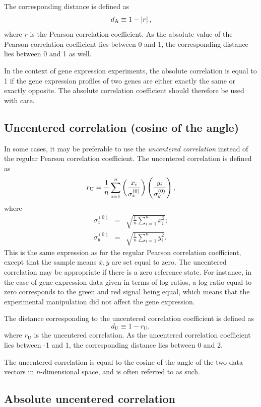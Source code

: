 \documentclass{report}
\begin{document}
The corresponding distance is defined as
$$d_{\textrm A} \equiv 1 - \left|r\right|,$$
where $r$ is the Pearson correlation coefficient. As the absolute value of the Pearson correlation coefficient lies between 0 and 1, the corresponding distance lies between 0 and 1 as well.

In the context of gene expression experiments, the absolute correlation is equal to 1 if the gene expression profiles of two genes are either exactly the same or exactly opposite. The absolute correlation coefficient should therefore be used with care.

\subsection*{Uncentered correlation (cosine of the angle)}

In some cases, it may be preferable to use the \emph{uncentered correlation} instead of the regular Pearson correlation coefficient. The uncentered correlation is defined as
$$r_{\textrm U} = \frac{1}{n} \sum_{i=1}^{n} \left(\frac{x_i}{\sigma_x^{(0)}} \right) \left(\frac{y_i}{\sigma_y^{(0)}} \right),$$
where
\begin{eqnarray}
\sigma_x^{(0)} & = & \sqrt{{\frac{1}{n}} \sum_{i=1}^{n}x_i^2}; \nonumber \\
\sigma_y^{(0)} & = & \sqrt{{\frac{1}{n}} \sum_{i=1}^{n}y_i^2}. \nonumber 
\end{eqnarray}
This is the same expression as for the regular Pearson correlation coefficient, except that the sample means
$\bar{x}, \bar{y}$
are set equal to zero. The uncentered correlation may be appropriate if there is a zero reference state. For instance, in the case of gene expression data given in terms of log-ratios, a log-ratio equal to zero corresponds to the green and red signal being equal, which means that the experimental manipulation did not affect the gene expression.

The distance corresponding to the uncentered correlation coefficient is defined as 
$$d_{\mbox{U}} \equiv 1 - r_{\mbox{U}},$$
where
$r_{\mbox{U}}$
is the uncentered correlation.
As the uncentered correlation coefficient lies between -1 and 1, the corresponding distance lies between 0 and 2.

The uncentered correlation is equal to the cosine of the angle of the two data vectors in $n$-dimensional space, and is often referred to as such.

\subsection*{Absolute uncentered correlation}
\end{document}
